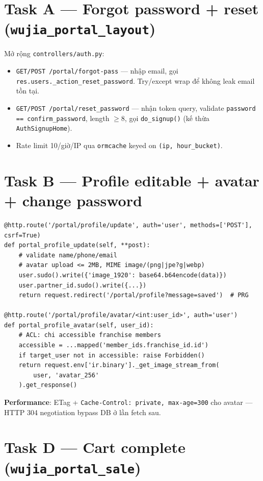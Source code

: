 \section{Task A --- Forgot password + reset (\texttt{wujia\_portal\_layout})}

Mở rộng \texttt{controllers/auth.py}:

\begin{itemize}[leftmargin=*]
    \item \texttt{GET/POST /portal/forgot-pass} --- nhập email, gọi \texttt{res.users.\_action\_reset\_password}. Try/except wrap để không leak email tồn tại.
    \item \texttt{GET/POST /portal/reset\_password} --- nhận token query, validate \texttt{password == confirm\_password}, length $\geq 8$, gọi \texttt{do\_signup()} (kế thừa \texttt{AuthSignupHome}).
    \item Rate limit 10/giờ/IP qua \texttt{ormcache} keyed on \texttt{(ip, hour\_bucket)}.
\end{itemize}

\section{Task B --- Profile editable + avatar + change password}

\begin{lstlisting}[style=python]
@http.route('/portal/profile/update', auth='user', methods=['POST'], csrf=True)
def portal_profile_update(self, **post):
    # validate name/phone/email
    # avatar upload <= 2MB, MIME image/(png|jpe?g|webp)
    user.sudo().write({'image_1920': base64.b64encode(data)})
    user.partner_id.sudo().write({...})
    return request.redirect('/portal/profile?message=saved')  # PRG

@http.route('/portal/profile/avatar/<int:user_id>', auth='user')
def portal_profile_avatar(self, user_id):
    # ACL: chi accessible franchise members
    accessible = ...mapped('member_ids.franchise_id.id')
    if target_user not in accessible: raise Forbidden()
    return request.env['ir.binary']._get_image_stream_from(
        user, 'avatar_256'
    ).get_response()
\end{lstlisting}

\textbf{Performance}: ETag + \texttt{Cache-Control: private, max-age=300} cho avatar --- HTTP 304 negotiation bypass DB ở lần fetch sau.

\section{Task D --- Cart complete (\texttt{wujia\_portal\_sale})}

